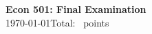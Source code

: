 \documentclass[11pt,addpoints]{exam}
\begin{document}
\begin{center}
  {\large\bfseries Econ 501: Final Examination}\\[2pt]
  \today \qquad Total: \numpoints\ points
\end{center}
\vspace{1em}

\gradetable[h][questions]
\vspace{1em}


\end{document}
